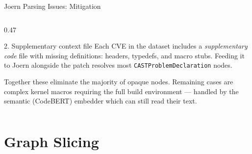 \documentclass[aspectratio=169,10pt]{beamer}
\begin{document}
\begin{frame}{Joern Parsing Issues: Mitigation}
\begin{columns}[T]
\begin{column}{0.47\textwidth}
  \vspace{0.3em}
  \begin{block}{2. Supplementary context file}
    \scriptsize Each CVE in the dataset includes a \emph{supplementary code}
    file with missing definitions: headers, typedefs, and
    macro stubs.  Feeding it to Joern alongside the patch
    resolves most \texttt{CASTProblemDeclaration} nodes.
  \end{block}

  \vspace{0.3em}
  {\scriptsize\color{black!55}
  Together these eliminate the majority of opaque nodes.
  Remaining cases are complex kernel macros requiring
  the full build environment — handled by the semantic
  (CodeBERT) embedder which can still read their text.}

\end{column}
\end{columns}
\end{frame}


\section{Graph Slicing}
\end{document}
